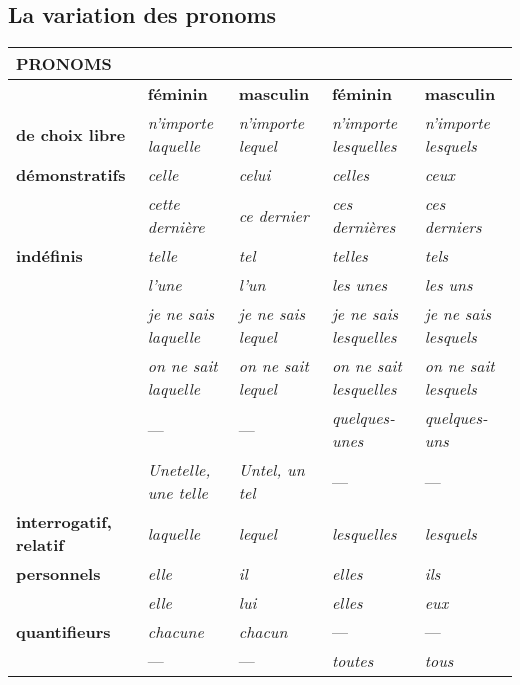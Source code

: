 \documentclass[UTF8]{report}
\begin{document}
\subsection{La variation des pronoms}
\begin{table}[H]
\centering
\small
\renewcommand{\arraystretch}{1.4}
\begin{tabular}{|>{\centering\arraybackslash}m{3.5cm}|>{\centering\arraybackslash}m{2.5cm}|>{\centering\arraybackslash}m{2.5cm}|>{\centering\arraybackslash}m{2.5cm}|>{\centering\arraybackslash}m{2.5cm}|}
\hline
\rowcolor{cyan!20}
\textbf{PRONOMS} & \multicolumn{2}{c|}{\textbf{SINGULIER}} & \multicolumn{2}{c|}{\textbf{PLURIEL}} \\
\hline
& \textbf{féminin} & \textbf{masculin} & \textbf{féminin} & \textbf{masculin} \\
\hline
\textbf{de choix libre} 
& \textit{n’importe laquelle} 
& \textit{n’importe lequel} 
& \textit{n’importe lesquelles} 
& \textit{n’importe lesquels} \\
\hline
\textbf{démonstratifs} 
& \textit{celle} 
& \textit{celui} 
& \textit{celles} 
& \textit{ceux} \\
\cline{2-5}
& \textit{cette dernière} 
& \textit{ce dernier} 
& \textit{ces dernières} 
& \textit{ces derniers} \\
\hline
\textbf{indéfinis} 
& \textit{telle} 
& \textit{tel} 
& \textit{telles} 
& \textit{tels} \\
\cline{2-5}
& \textit{l’une} 
& \textit{l’un} 
& \textit{les unes} 
& \textit{les uns} \\
\cline{2-5}
& \textit{je ne sais laquelle} 
& \textit{je ne sais lequel} 
& \textit{je ne sais lesquelles} 
& \textit{je ne sais lesquels} \\
\cline{2-5}
& \textit{on ne sait laquelle} 
& \textit{on ne sait lequel} 
& \textit{on ne sait lesquelles} 
& \textit{on ne sait lesquels} \\
\cline{2-5}
& — & — 
& \textit{quelques-unes} 
& \textit{quelques-uns} \\
\cline{2-5}
& \textit{Unetelle, une telle} 
& \textit{Untel, un tel} 
& — & — \\
\hline
\textbf{interrogatif, relatif} 
& \textit{laquelle} 
& \textit{lequel} 
& \textit{lesquelles} 
& \textit{lesquels} \\
\hline
\textbf{personnels} 
& \textit{elle} 
& \textit{il} 
& \textit{elles} 
& \textit{ils} \\
\cline{2-5}
& \textit{elle} 
& \textit{lui} 
& \textit{elles} 
& \textit{eux} \\
\hline
\textbf{quantifieurs} 
& \textit{chacune} 
& \textit{chacun} 
& — & — \\
\cline{2-5}
& — & — 
& \textit{toutes} 
& \textit{tous} \\
\hline
\end{tabular}
\end{table}
\end{document}
